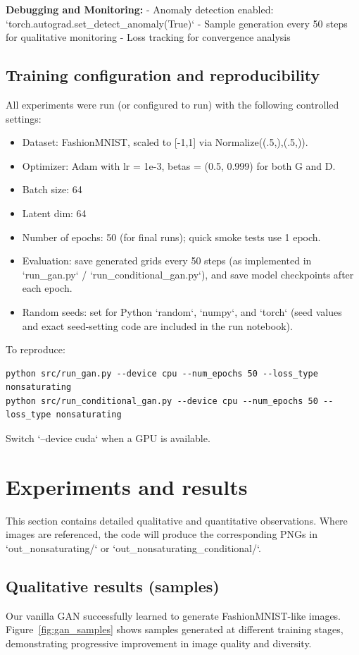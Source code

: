 \documentclass{article}
\begin{document}
\textbf{Debugging and Monitoring:}
- Anomaly detection enabled: `torch.autograd.set_detect_anomaly(True)`
- Sample generation every 50 steps for qualitative monitoring
- Loss tracking for convergence analysis

\subsection{Training configuration and reproducibility}
All experiments were run (or configured to run) with the following controlled settings:
\begin{itemize}
  \item Dataset: FashionMNIST, scaled to [-1,1] via Normalize((.5,),(.5,)).
  \item Optimizer: Adam with lr = 1e-3, betas = (0.5, 0.999) for both G and D.
  \item Batch size: 64
  \item Latent dim: 64
  \item Number of epochs: 50 (for final runs); quick smoke tests use 1 epoch.
  \item Evaluation: save generated grids every 50 steps (as implemented in `run_gan.py` / `run_conditional_gan.py`), and save model checkpoints after each epoch.
  \item Random seeds: set for Python `random`, `numpy`, and `torch` (seed values and exact seed-setting code are included in the run notebook).
\end{itemize}
To reproduce:
\begin{verbatim}
python src/run_gan.py --device cpu --num_epochs 50 --loss_type nonsaturating
python src/run_conditional_gan.py --device cpu --num_epochs 50 --loss_type nonsaturating
\end{verbatim}
Switch `--device cuda` when a GPU is available.

\section{Experiments and results}
This section contains detailed qualitative and quantitative observations. Where images are referenced, the code will produce the corresponding PNGs in `out_nonsaturating/` or `out_nonsaturating_conditional/`.

\subsection{Qualitative results (samples)}
Our vanilla GAN successfully learned to generate FashionMNIST-like images. Figure~\ref{fig:gan_samples} shows samples generated at different training stages, demonstrating progressive improvement in image quality and diversity.
\end{document}
